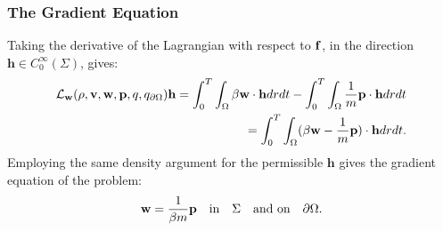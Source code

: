 \subsubsection{The Gradient Equation}
Taking the derivative of the Lagrangian with respect to $\mathbf{f}$, in the direction $\mathbf{h} \in C_0^\infty(\Sigma)$, gives:
\begin{align*}
\mathcal{L}_{\mathbf{w}}(\rho,\mathbf{v},\mathbf{w},\mathbf{p},q,{q}_{\partial \Omega}) \mathbf{h}= \int_0^T \int_\Omega \beta \mathbf{w} \cdot \mathbf{h} dr dt - \int_0^T \int_\Omega \frac{1}{m} \mathbf{p} \cdot \mathbf{h} dr dt \\
= \int_0^T \int_\Omega ( \beta \mathbf{w} - \frac{1}{m}\mathbf{p}) \cdot \mathbf{h} dr dt.
\end{align*}
Employing the same density argument for the permissible $\mathbf{h}$ gives the gradient equation of the problem:
\begin{align*}
 \mathbf{w} = \frac{1}{\beta m} \mathbf{p} \quad \text{in} \quad \Sigma \quad \text{and on} \quad \partial\Omega.
\end{align*}

